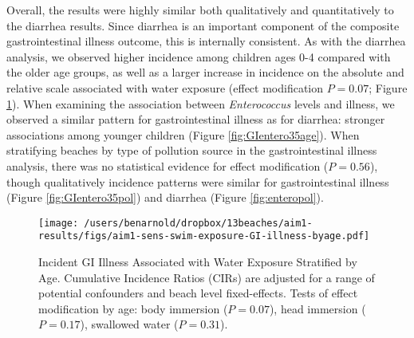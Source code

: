 \documentclass[12pt]{article}\usepackage[]{graphicx}\usepackage[]{color}
\begin{document}
Overall, the results were highly similar both qualitatively and quantitatively to the diarrhea results. Since diarrhea is an important component of the composite gastrointestinal illness outcome, this is internally consistent.  As with the diarrhea analysis, we observed higher incidence among children ages 0-4 compared with the older age groups, as well as a larger increase in incidence on the absolute and relative scale associated with water exposure (effect modification $P=0.07$; Figure \ref{fig:GIswimex}).  When examining the association between \textit{Enterococcus} levels and illness, we observed a similar pattern for gastrointestinal illness as for diarrhea: stronger associations among younger children (Figure \ref{fig:GIentero35age}). When stratifying beaches by type of pollution source in the gastrointestinal illness analysis, there was no statistical evidence for effect modification ($P=0.56$), though qualitatively incidence patterns were similar for gastrointestinal illness (Figure \ref{fig:GIentero35pol}) and diarrhea (Figure \ref{fig:enteropol}).

\begin{landscape}
\begin{figure}[htbp]
\begin{center}
\texttt{[image: /users/benarnold/dropbox/13beaches/aim1-results/figs/aim1-sens-swim-exposure-GI-illness-byage.pdf]}
\begin{minipage}{1.2\textwidth}
\caption{Incident GI Illness Associated with Water Exposure Stratified by Age. Cumulative Incidence Ratios (CIRs) are adjusted for a range of potential confounders and beach level fixed-effects. Tests of effect modification by age: body immersion ($P=0.07$), head immersion ($P=0.17$), swallowed water ($P=0.31$).}
\label{fig:GIswimex}
\end{minipage}
\end{center}
\end{figure}
\end{landscape}
\end{document}
